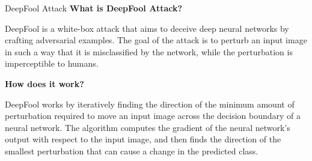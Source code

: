\documentclass[aspectratio=169, 9pt]{beamer}
\theoremstyle{definition}
\begin{document}
\begin{frame}{DeepFool Attack}
\textbf{What is DeepFool Attack?}

DeepFool is a white-box attack that aims to deceive deep neural networks by crafting adversarial examples. The goal of the attack is to perturb an input image in such a way that it is misclassified by the network, while the perturbation is imperceptible to humans.

\vspace{0.5cm}

\textbf{How does it work?}

DeepFool works by iteratively finding the direction of the minimum amount of perturbation required to move an input image across the decision boundary of a neural network. The algorithm computes the gradient of the neural network's output with respect to the input image, and then finds the direction of the smallest perturbation that can cause a change in the predicted class.

\end{frame}
\end{document}
